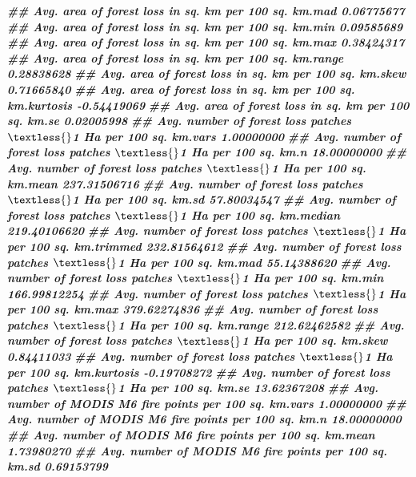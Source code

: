 \documentclass[10pt,landscape,a3paper]{article}
\newenvironment{Shaded}{\begin{snugshade}}{\end{snugshade}}
\newcommand{\DocumentationTok}[1]{\textcolor[rgb]{0.56,0.35,0.01}{\textbf{\textit{#1}}}}
\begin{document}
\begin{Shaded}
\begin{Highlighting}[]
\DocumentationTok{\#\# Avg. area of forest loss in sq. km per 100 sq. km.mad                0.06775677}
\DocumentationTok{\#\# Avg. area of forest loss in sq. km per 100 sq. km.min                0.09585689}
\DocumentationTok{\#\# Avg. area of forest loss in sq. km per 100 sq. km.max                0.38424317}
\DocumentationTok{\#\# Avg. area of forest loss in sq. km per 100 sq. km.range              0.28838628}
\DocumentationTok{\#\# Avg. area of forest loss in sq. km per 100 sq. km.skew               0.71665840}
\DocumentationTok{\#\# Avg. area of forest loss in sq. km per 100 sq. km.kurtosis          {-}0.54419069}
\DocumentationTok{\#\# Avg. area of forest loss in sq. km per 100 sq. km.se                 0.02005998}
\DocumentationTok{\#\# Avg. number of forest loss patches $\textless{}$1 Ha per 100 sq. km.vars       1.00000000}
\DocumentationTok{\#\# Avg. number of forest loss patches $\textless{}$1 Ha per 100 sq. km.n         18.00000000}
\DocumentationTok{\#\# Avg. number of forest loss patches $\textless{}$1 Ha per 100 sq. km.mean     237.31506716}
\DocumentationTok{\#\# Avg. number of forest loss patches $\textless{}$1 Ha per 100 sq. km.sd        57.80034547}
\DocumentationTok{\#\# Avg. number of forest loss patches $\textless{}$1 Ha per 100 sq. km.median   219.40106620}
\DocumentationTok{\#\# Avg. number of forest loss patches $\textless{}$1 Ha per 100 sq. km.trimmed  232.81564612}
\DocumentationTok{\#\# Avg. number of forest loss patches $\textless{}$1 Ha per 100 sq. km.mad       55.14388620}
\DocumentationTok{\#\# Avg. number of forest loss patches $\textless{}$1 Ha per 100 sq. km.min      166.99812254}
\DocumentationTok{\#\# Avg. number of forest loss patches $\textless{}$1 Ha per 100 sq. km.max      379.62274836}
\DocumentationTok{\#\# Avg. number of forest loss patches $\textless{}$1 Ha per 100 sq. km.range    212.62462582}
\DocumentationTok{\#\# Avg. number of forest loss patches $\textless{}$1 Ha per 100 sq. km.skew       0.84411033}
\DocumentationTok{\#\# Avg. number of forest loss patches $\textless{}$1 Ha per 100 sq. km.kurtosis  {-}0.19708272}
\DocumentationTok{\#\# Avg. number of forest loss patches $\textless{}$1 Ha per 100 sq. km.se        13.62367208}
\DocumentationTok{\#\# Avg. number of MODIS M6 fire points per 100 sq. km.vars              1.00000000}
\DocumentationTok{\#\# Avg. number of MODIS M6 fire points per 100 sq. km.n                18.00000000}
\DocumentationTok{\#\# Avg. number of MODIS M6 fire points per 100 sq. km.mean              1.73980270}
\DocumentationTok{\#\# Avg. number of MODIS M6 fire points per 100 sq. km.sd                0.69153799}

\end{Highlighting}
\end{Shaded}
\end{document}
